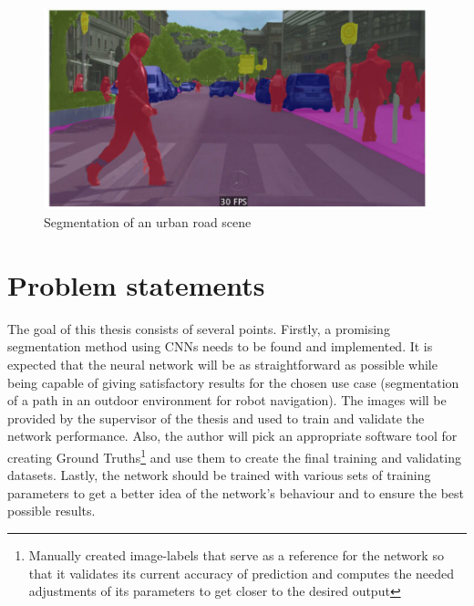 \vspace{5mm}
\begin{figure}[htb]
	\begin{center}
		\includegraphics*[width=13cm, keepaspectratio]{obr/semseg.jpg}
	\end{center}
	\caption{Segmentation of an urban road scene \cite{sergios}} 
	\label{segment}
\end{figure}

\chapter{Problem statements}
The goal of this thesis consists of several points. Firstly, a promising segmentation method using CNNs needs to be found and implemented. It is expected that the neural network will be as straightforward as possible while being capable of giving satisfactory results for the chosen use case (segmentation of a path in an outdoor environment for robot navigation). The images will be provided by the supervisor of the thesis and used to train and validate the network performance. Also, the author will pick an appropriate software tool for creating Ground Truths\footnote{Manually created image-labels that serve as a reference for the network so that it validates its current accuracy of prediction and computes the needed adjustments of its parameters to get closer to the desired output} and use them to create the final training and validating datasets. Lastly, the network should be trained with various sets of training parameters to get a better idea of the network's behaviour and to ensure the best possible results. 

